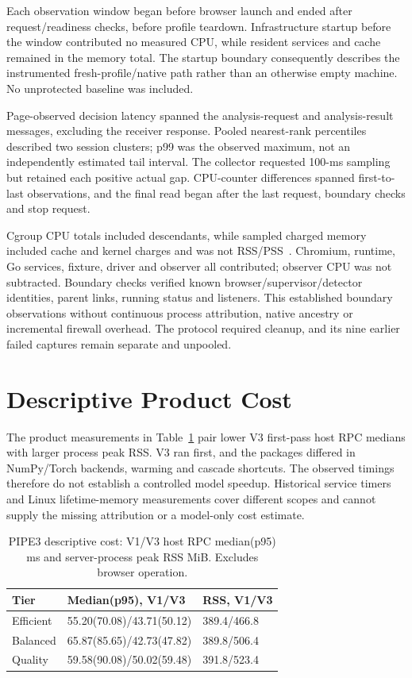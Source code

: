 \documentclass[conference]{IEEEtran}
\begin{document}
Each observation window began before browser launch and ended after request/readiness checks, before profile teardown. Infrastructure startup before the window contributed no measured CPU, while resident services and cache remained in the memory total. The startup boundary consequently describes the instrumented fresh-profile/native path rather than an otherwise empty machine. No unprotected baseline was included.

Page-observed decision latency spanned the analysis-request and analysis-result messages, excluding the receiver response. Pooled nearest-rank percentiles described two session clusters; p99 was the observed maximum, not an independently estimated tail interval. The collector requested 100-ms sampling but retained each positive actual gap. CPU-counter differences spanned first-to-last observations, and the final read began after the last request, boundary checks and stop request.

Cgroup CPU totals included descendants, while sampled charged memory included cache and kernel charges and was not RSS/PSS~\cite{LinuxCgroupV2Interfaces2026}. Chromium, runtime, Go services, fixture, driver and observer all contributed; observer CPU was not subtracted. Boundary checks verified known browser/supervisor/detector identities, parent links, running status and listeners. This established boundary observations without continuous process attribution, native ancestry or incremental firewall overhead. The protocol required cleanup, and its nine earlier failed captures remain separate and unpooled.



\section{Descriptive Product Cost}
\label{app:product_cost}
The product measurements in Table~\ref{tab:cost} pair lower V3 first-pass host RPC medians with larger process peak RSS. V3 ran first, and the packages differed in NumPy/Torch backends, warming and cascade shortcuts. The observed timings therefore do not establish a controlled model speedup. Historical service timers and Linux lifetime-memory measurements cover different scopes and cannot supply the missing attribution or a model-only cost estimate.

\begin{table}[H]
\centering
\caption{PIPE3 descriptive cost: V1/V3 host RPC median(p95) ms and server-process peak RSS MiB. Excludes browser operation.}
\label{tab:cost}
\small
\begin{tabular}{lll}
\toprule
Tier & Median(p95), V1/V3 & RSS, V1/V3 \\
\midrule
Efficient &55.20(70.08)/43.71(50.12) &389.4/466.8 \\
Balanced &65.87(85.65)/42.73(47.82) &389.8/506.4 \\
Quality &59.58(90.08)/50.02(59.48) &391.8/523.4 \\
\bottomrule
\end{tabular}
\end{table}
\end{document}
